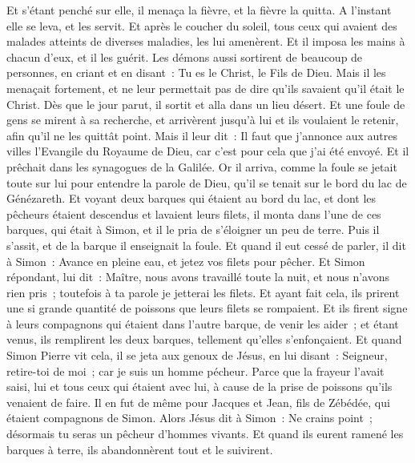 \begin{multicols}{2}
Et s'étant penché sur elle, il menaça la fièvre, et la fièvre la quitta. A l'instant elle se leva, et les servit.
Et après le coucher du soleil, tous ceux qui avaient des malades atteints de diverses maladies, les lui amenèrent. Et il imposa les mains à chacun d'eux, et il les guérit.
Les démons aussi sortirent de beaucoup de personnes, en criant et en disant~: Tu es le Christ, le Fils de Dieu. Mais il les menaçait fortement, et ne leur permettait pas de dire qu'ils savaient qu'il était le Christ.
Dès que le jour parut, il sortit et alla dans un lieu désert. Et une foule de gens se mirent à sa recherche, et arrivèrent jusqu'à lui et ils voulaient le retenir, afin qu'il ne les quittât point.
Mais il leur dit~: Il faut que j'annonce aux autres villes l'Evangile du Royaume de Dieu, car c'est pour cela que j'ai été envoyé.
Et il prêchait dans les synagogues de la Galilée.
\VerseOne{}Or il arriva, comme la foule se jetait toute sur lui pour entendre la parole de Dieu, qu'il se tenait sur le bord du lac de Génézareth.
Et voyant deux barques qui étaient au bord du lac, et dont les pêcheurs étaient descendus et lavaient leurs filets, il monta dans l'une de ces barques, qui était à Simon,
et il le pria de s'éloigner un peu de terre. Puis il s'assit, et de la barque il enseignait la foule.
Et quand il eut cessé de parler, il dit à Simon~: Avance en pleine eau, et jetez vos filets pour pêcher.
Et Simon répondant, lui dit~: Maître, nous avons travaillé toute la nuit, et nous n'avons rien pris~; toutefois à ta parole je jetterai les filets.
Et ayant fait cela, ils prirent une si grande quantité de poissons que leurs filets se rompaient.
Et ils firent signe à leurs compagnons qui étaient dans l'autre barque, de venir les aider~; et étant venus, ils remplirent les deux barques, tellement qu'elles s'enfonçaient.
Et quand Simon Pierre vit cela, il se jeta aux genoux de Jésus, en lui disant~: Seigneur, retire-toi de moi~; car je suis un homme pécheur.
Parce que la frayeur l'avait saisi, lui et tous ceux qui étaient avec lui, à cause de la prise de poissons qu'ils venaient de faire. Il en fut de même pour Jacques et Jean, fils de Zébédée, qui étaient compagnons de Simon.
Alors Jésus dit à Simon~: Ne crains point~; désormais tu seras un pêcheur d'hommes vivants.
Et quand ils eurent ramené les barques à terre, ils abandonnèrent tout et le suivirent.

\end{multicols}
